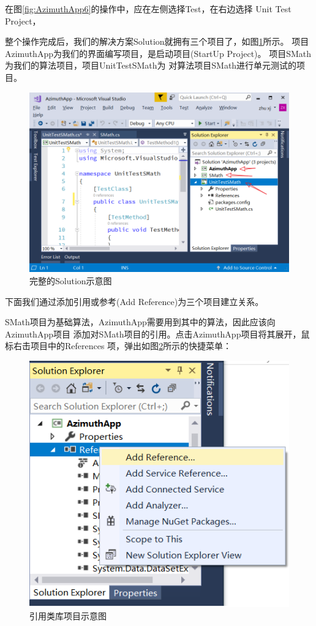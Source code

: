 在图\ref{fig:AzimuthApp6}的操作中，应在左侧选择Test，在右边选择 Unit Test Project，

整个操作完成后，我们的解决方案Solution就拥有三个项目了，如图\ref{fig:AzimuthApp7}所示。
项目AzimuthApp为我们的界面编写项目，是启动项目(StartUp Project)。
项目SMath为我们的算法项目，项目UnitTestSMath为
对算法项目SMath进行单元测试的项目。

\begin{figure}[htbp]
	\centering
	\includegraphics[scale=0.7]{surveybase/AzimuthApp7.png}
	\caption{完整的Solution示意图}
	\label{fig:AzimuthApp7}
\end{figure}

下面我们通过添加引用或参考(Add Reference)为三个项目建立关系。

SMath项目为基础算法，AzimuthApp需要用到其中的算法，因此应该向AzimuthApp项目
添加对SMath项目的引用。点击AzimuthApp项目将其展开，鼠标右击项目中的References
项，弹出如图\ref{fig:AzimuthApp4}所示的快捷菜单：

\begin{figure}[htbp]
	\centering
	\includegraphics[scale=0.8]{surveybase/AzimuthApp4.png}
	\caption{引用类库项目示意图}
	\label{fig:AzimuthApp4}
\end{figure}

